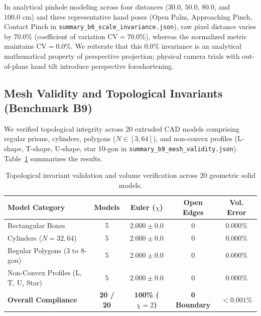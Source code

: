 In analytical pinhole modeling across four distances ($30.0$, $50.0$, $80.0$, and $100.0\text{ cm}$) and three representative hand poses (Open Palm, Approaching Pinch, Contact Pinch in \texttt{summary\_b6\_scale\_invariance.json}), raw pixel distance varies by $70.0\%$ (coefficient of variation $\text{CV} = 70.0\%$), whereas the normalized metric maintains $\text{CV} = 0.0\%$. We reiterate that this $0.0\%$ invariance is an analytical mathematical property of perspective projection; physical camera trials with out-of-plane hand tilt introduce perspective foreshortening.

\subsection{Mesh Validity and Topological Invariants (Benchmark B9)}
We verified topological integrity across 20 extruded CAD models comprising regular prisms, cylinders, polygons ($N \in [3, 64]$), and non-convex profiles (L-shape, T-shape, U-shape, star 10-gon in \texttt{summary\_b9\_mesh\_validity.json}). Table~\ref{tab:mesh_validity} summarizes the results.

\begin{table}[t]
\caption{Topological invariant validation and volume verification across 20 geometric solid models.}
\label{tab:mesh_validity}
\centering
\small
\begin{tabular}{lcccc}
\toprule
\textbf{Model Category} & \textbf{Models} & \textbf{Euler ($\chi$)} & \textbf{Open Edges} & \textbf{Vol. Error} \\
\midrule
Rectangular Boxes & 5 & $2.000 \pm 0.0$ & 0 & $0.000\%$ \\
Cylinders ($N=32, 64$) & 5 & $2.000 \pm 0.0$ & 0 & $0.000\%$ \\
Regular Polygons (3 to 8-gon) & 5 & $2.000 \pm 0.0$ & 0 & $0.000\%$ \\
Non-Convex Profiles (L, T, U, Star) & 5 & $2.000 \pm 0.0$ & 0 & $0.000\%$ \\
\midrule
\textbf{Overall Compliance} & \textbf{20 / 20} & \textbf{100\% ($\chi=2$)} & \textbf{0 Boundary} & \textbf{$< 0.001\%$} \\
\bottomrule
\end{tabular}
\end{table}

